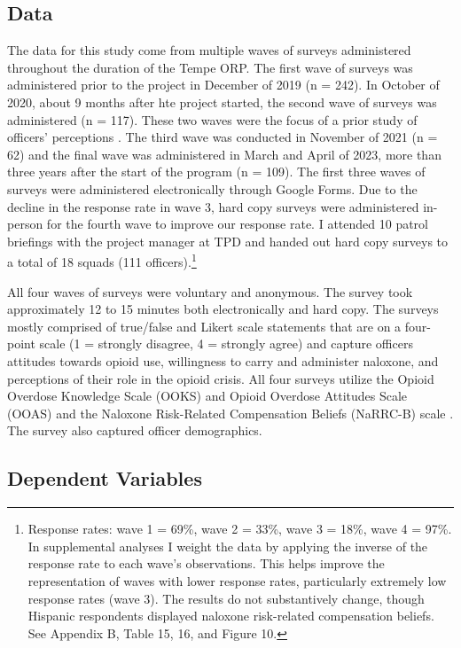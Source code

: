 \subsection{Data}

The data for this study come from multiple waves of surveys administered throughout the duration of the Tempe ORP. The first wave of surveys was administered prior to the project in December of 2019 (n = 242). In October of 2020, about 9 months after hte project started, the second wave of surveys was administered (n = 117). These two waves were the focus of a prior study of officers’ perceptions \parencite{white_narcan_2021}. The third wave was conducted in November of 2021 (n = 62) and the final wave was administered in March and April of 2023, more than three years after the start of the program (n = 109). The first three waves of surveys were administered electronically through Google Forms. Due to the decline in the response rate in wave 3, hard copy surveys were administered in-person for the fourth wave to improve our response rate. I attended 10 patrol briefings with the project manager at TPD and handed out hard copy surveys to a total of 18 squads (111 officers).\footnote{Response rates: wave 1 = 69\%, wave 2 = 33\%, wave 3 = 18\%, wave 4 = 97\%. In supplemental analyses I weight the data by applying the inverse of the response rate to each wave's observations. This helps improve the representation of waves with lower response rates, particularly extremely low response rates (wave 3). The results do not substantively change, though Hispanic respondents displayed naloxone risk-related compensation beliefs. See Appendix B, Table 15, 16, and Figure 10.} 

All four waves of surveys were voluntary and anonymous. The survey took approximately 12 to 15 minutes both electronically and hard copy. The surveys mostly comprised of true/false and Likert scale statements that are on a four-point scale (1 = strongly disagree, 4 = strongly agree) and capture officers attitudes towards opioid use, willingness to carry and administer naloxone, and perceptions of their role in the opioid crisis. All four surveys utilize the Opioid Overdose Knowledge Scale (OOKS) and Opioid Overdose Attitudes Scale (OOAS) \parencite{williams_development_2013} and the Naloxone Risk-Related Compensation Beliefs (NaRRC-B) scale \parencite{winograd_concerns_2019}. The survey also captured officer demographics.

\subsection{Dependent Variables}

